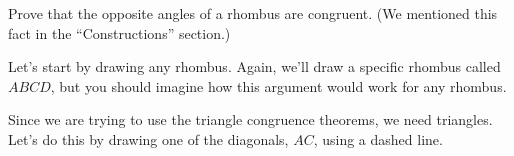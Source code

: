 \documentclass{ximera}
\begin{document}
\begin{example}
Prove that the opposite angles of a rhombus are congruent. (We mentioned this fact in the ``Constructions'' section.) 

Let's start by drawing any rhombus. Again, we'll draw a specific rhombus called $ABCD$, but you should imagine how this argument would work for any rhombus.
\begin{center}\end{center}
Since we are trying to use the triangle congruence theorems, we need triangles. Let's do this by drawing one of the diagonals, $AC$, using a dashed line.
\begin{center}
\end{center}
\end{example}
\end{document}
